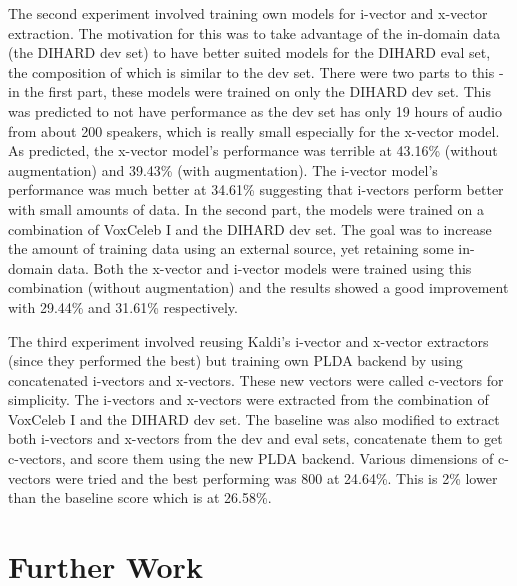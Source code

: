 		The second experiment involved training own models for i-vector and x-vector extraction. The motivation for this was to take advantage of the in-domain data (the DIHARD dev set) to have better suited models for the DIHARD eval set, the composition of which is similar to the dev set. There were two parts to this - in the first part, these models were trained on only the DIHARD dev set. This was predicted to not have performance as the dev set has only 19 hours of audio from about 200 speakers, which is really small especially for the x-vector model. As predicted, the x-vector model's performance was terrible at 43.16\% (without augmentation) and 39.43\% (with augmentation). The i-vector model's performance was much better at 34.61\% suggesting that i-vectors perform better with small amounts of data. In the second part, the models were trained on a combination of VoxCeleb I and the DIHARD dev set. The goal was to increase the amount of training data using an external source, yet retaining some in-domain data. Both the x-vector and i-vector models were trained using this combination (without augmentation) and the results showed a good improvement with 29.44\% and 31.61\% respectively.
		
		The third experiment involved reusing Kaldi's i-vector and x-vector extractors (since they performed the best) but training own PLDA backend by using concatenated i-vectors and x-vectors. These new vectors were called c-vectors for simplicity. The i-vectors and x-vectors were extracted from the combination of VoxCeleb I and the DIHARD dev set. The baseline was also modified to extract both i-vectors and x-vectors from the dev and eval sets, concatenate them to get c-vectors, and score them using the new PLDA backend. Various dimensions of c-vectors were tried and the best performing was 800 at 24.64\%. This is 2\% lower than the baseline score which is at 26.58\%.
		
		
		
	\section{Further Work}